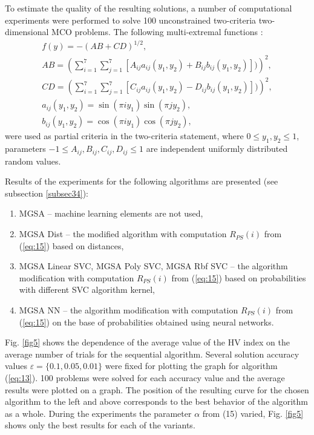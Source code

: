 \documentclass[runningheads]{llncs}
\begin{document}
To estimate the quality of the resulting solutions, a number of computational experiments were performed to solve 100 unconstrained two-criteria two-dimensional MCO problems. The following multi-extremal functions \cite{Gergel2019_2}:
\begin{equation}
    \label{eq:16}
		\begin{matrix}
		  f(y)= -(AB + CD)^{1/2}, \\
			AB =(\sum_{i=1}^7{\sum_{j=1}^7{[A_{ij} a_{ij} (y_1,y_2) + B_{ij} b_{ij} (y_1,y_2)])}})^2, \\
			CD =(\sum_{i=1}^7{\sum_{j=1}^7{[C_{ij} a_{ij} (y_1,y_2) - D_{ij} b_{ij} (y_1,y_2)])}})^2, \\
			a_{ij} (y_1,y_2) = \sin(\pi i y_1) \sin(\pi j y_2), \\
			b_{ij} (y_1,y_2) = \cos(\pi i y_1) \cos(\pi j y_2),
		\end{matrix}
\end{equation}
were used as partial criteria in the two-criteria statement, where $0 \leq y_1, y_2 \leq 1$, parameters $-1 \leq A_{ij},B_{ij},C_{ij},D_{ij} \leq 1$ are independent uniformly distributed random values.

Results of the experiments for the following algorithms are presented (see subsection \ref{subsec34}):
\begin{enumerate}
	\item MGSA -- machine learning elements are not used,
	\item MGSA Dist -- the modified algorithm with computation $R_{PS}(i)$ from (\ref{eq:15}) based on distances,
	\item MGSA Linear SVC, MGSA Poly SVC, MGSA Rbf SVC -- the algorithm modification with computation $R_{PS}(i)$ from (\ref{eq:15}) based on probabilities with different SVC algorithm kernel,
	\item MGSA NN -- the algorithm modification with computation $R_{PS}(i)$ from (\ref{eq:15}) on the base of probabilities obtained using neural networks.
\end{enumerate}
	
Fig. \ref{fig5} shows the dependence of the average value of the HV index on the average number of trials for the sequential algorithm. Several solution accuracy values $\varepsilon = \{0.1,0.05,0.01\}$ were fixed for plotting the graph for algorithm (\ref{eq:13}). 100 problems were solved for each accuracy value and the average results were plotted on a graph. The position of the resulting curve for the chosen algorithm to the left and above corresponds to the best behavior of the algorithm as a whole. During the experiments the parameter $\alpha$ from (15) varied, Fig. \ref{fig5} shows only the best results for each of the variants.
\end{document}
